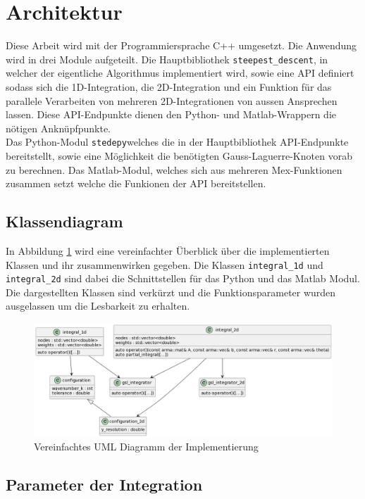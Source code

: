 \section{Architektur}

Diese Arbeit wird mit der Programmiersprache C++ umgesetzt.
Die Anwendung wird in drei Module aufgeteilt. 
Die Hauptbibliothek \texttt{steepest\_descent}, in welcher der eigentliche Algorithmus implementiert wird, sowie eine API definiert sodass sich die 1D-Integration, die 2D-Integration und ein Funktion für das parallele Verarbeiten von mehreren 2D-Integrationen von aussen Ansprechen lassen.
Diese API-Endpunkte dienen den Python- und Matlab-Wrappern die nötigen Anknüpfpunkte. 
\\
Das Python-Modul \texttt{stedepy}welches die in der Hauptbibliothek API-Endpunkte bereitstellt, sowie eine Möglichkeit die benötigten Gauss-Laguerre-Knoten vorab zu berechnen.
Das Matlab-Modul, welches sich aus mehreren Mex-Funktionen zusammen setzt welche die Funkionen der API bereitstellen.
\\
\subsection{Klassendiagram}

In Abbildung \ref{uml} wird eine vereinfachter Überblick über die implementierten Klassen und ihr zusammenwirken gegeben.
Die Klassen \texttt{integral\_1d} und \texttt{integral\_2d} sind dabei die Schnittstellen für das Python und das Matlab Modul.
Die dargestellten Klassen sind verkürzt und die Funktionsparameter wurden ausgelassen um die Lesbarkeit zu erhalten.

\begin{figure}
    \includegraphics[width=\textwidth]{images/uml.png}
    \caption{Vereinfachtes UML Diagramm der Implementierung}\label{uml}
\end{figure}

\pagebreak

\subsection{Parameter der Integration}

